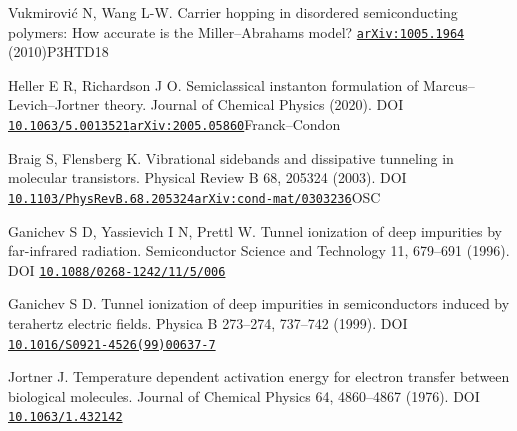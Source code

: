 \documentclass[11pt,a4paper]{article}
\makeatletter
\renewenvironment{thebibliography}[1]
 {\list{\@biblabel{\@arabic\c@enumiv}}{\settowidth\labelwidth{\@biblabel{#1}}\leftmargin\labelwidth\advance\leftmargin\labelsep\usecounter{enumiv}\setlength\itemsep{.4em}\setlength\parsep{0pt}}\sloppy}
 {\endlist}
\makeatother
\begin{document}
\begin{thebibliography}{R20}
\par
 Vukmirović N, Wang L-W. Carrier hopping in disordered semiconducting polymers: How accurate is the Miller–Abrahams model? \href{https://arxiv.org/abs/1005.1964}{\nolinkurl{arXiv:1005.1964}} (2010)\allowbreak{}P3HT\allowbreak{}D18\allowbreak{}
\par
 Heller E R, Richardson J O. Semiclassical instanton formulation of Marcus–Levich–Jortner theory. Journal of Chemical Physics (2020). DOI \href{https://doi.org/10.1063/5.0013521}{\nolinkurl{10.1063/5.0013521}}\allowbreak{}\href{https://arxiv.org/abs/2005.05860}{\nolinkurl{arXiv:2005.05860}}\allowbreak{}Franck–Condon\allowbreak{}
\par
 Braig S, Flensberg K. Vibrational sidebands and dissipative tunneling in molecular transistors. Physical Review B 68, 205324 (2003). DOI \href{https://doi.org/10.1103/PhysRevB.68.205324}{\nolinkurl{10.1103/PhysRevB.68.205324}}\allowbreak{}\href{https://arxiv.org/abs/cond-mat/0303236}{\nolinkurl{arXiv:cond-mat/0303236}}\allowbreak{}OSC\allowbreak{}
\par
 Ganichev S D, Yassievich I N, Prettl W. Tunnel ionization of deep impurities by far-infrared radiation. Semiconductor Science and Technology 11, 679–691 (1996). DOI \href{https://doi.org/10.1088/0268-1242/11/5/006}{\nolinkurl{10.1088/0268-1242/11/5/006}}\allowbreak{}
\par
 Ganichev S D. Tunnel ionization of deep impurities in semiconductors induced by terahertz electric fields. Physica B 273–274, 737–742 (1999). DOI \href{https://doi.org/10.1016/S0921-4526(99)00637-7}{\nolinkurl{10.1016/S0921-4526(99)00637-7}}\allowbreak{}
\par
 Jortner J. Temperature dependent activation energy for electron transfer between biological molecules. Journal of Chemical Physics 64, 4860–4867 (1976). DOI \href{https://doi.org/10.1063/1.432142}{\nolinkurl{10.1063/1.432142}}\allowbreak{}
\par
\end{thebibliography}
\end{document}
